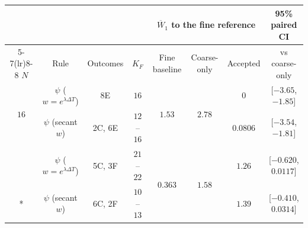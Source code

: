 \setlength{\tabcolsep}{1.5pt}\renewcommand{\arraystretch}{1.15}
\begin{tabular*}{\textwidth}{@{\extracolsep{\fill}}cccccccc@{}}\toprule
& & & & \multicolumn{3}{c}{$\overline{W}_1$ to the fine reference} & 95\% paired CI\\
\cmidrule(lr){5-7}\cmidrule(lr){8-8}
$N$ & Rule & Outcomes & $K_F$ & Fine baseline & Coarse-only & Accepted & vs coarse-only\\
\midrule
\multirow{2}{*}{$16$} & $\psi$ ($w=e^{\lambda\Delta T}$) & 8E & $16$ & \multirow{2}{*}{$1.53$} & \multirow{2}{*}{$2.78$} & $0$ & [$-3.65$, $-1.85$]\\*
 & $\psi$ (secant $w$) & 2C, 6E & $12$--$16$ &  &  & $0.0806$ & [$-3.54$, $-1.81$]\\
\addlinespace[3pt]
\multirow{2}{*}{$128$} & $\psi$ ($w=e^{\lambda\Delta T}$) & 5C, 3F & $21$--$22$ & \multirow{2}{*}{$0.363$} & \multirow{2}{*}{$1.58$} & $1.26$ & [$-0.620$, $0.0117$]\\*
 & $\psi$ (secant $w$) & 6C, 2F & $10$--$13$ &  &  & $1.39$ & [$-0.410$, $0.0314$]\\
\bottomrule\end{tabular*}
